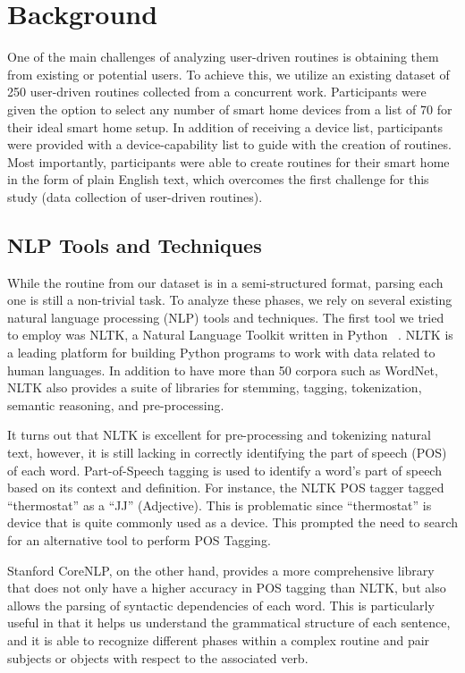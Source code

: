 \section{Background}
\label{sec:background}

% 

One of the main challenges of analyzing user-driven routines is obtaining them from existing or potential users. To achieve this, we utilize an existing dataset of 250 user-driven routines collected from a concurrent work. Participants were given the option to select any number of smart home devices from a list of 70 for their ideal smart home setup. In addition of receiving a device list, participants were provided with a device-capability list to guide with the creation of routines. Most importantly, participants were able to create routines for their smart home in the form of plain English text, which overcomes the first challenge for this study (\ie data collection of user-driven routines).
\subsection{NLP Tools and Techniques}

While the routine from our dataset is in a semi-structured format, parsing each one is still a non-trivial task. To analyze these phases, we rely on several existing natural language processing (NLP) tools and techniques.
The first tool we tried to employ was NLTK, a Natural Language Toolkit written in Python ~\cite{nltk}. NLTK is a leading platform for building Python programs to work with data related to human languages. In addition to have more than 50 corpora such as WordNet, NLTK also provides a suite of libraries for stemming, tagging, tokenization, semantic reasoning, and pre-processing.

It turns out that NLTK is excellent for pre-processing and tokenizing natural text, however, it is still lacking in correctly identifying the part of speech (POS) of each word.
Part-of-Speech tagging is used to identify a word's part of speech based on its context and definition.  For instance, the NLTK POS tagger tagged ``thermostat'' as a ``JJ'' (Adjective). This is problematic since ``thermostat'' is device that is quite commonly used as a device. This prompted the need to search for an alternative tool to perform POS Tagging.

Stanford CoreNLP, on the other hand, provides a more comprehensive library that does not only have a higher accuracy in POS tagging than NLTK, but also allows the parsing of syntactic dependencies of each word. This is particularly useful in that it helps us understand the grammatical structure of each sentence, and it is able to recognize different phases within a complex routine and pair subjects or objects with respect to the associated verb.


